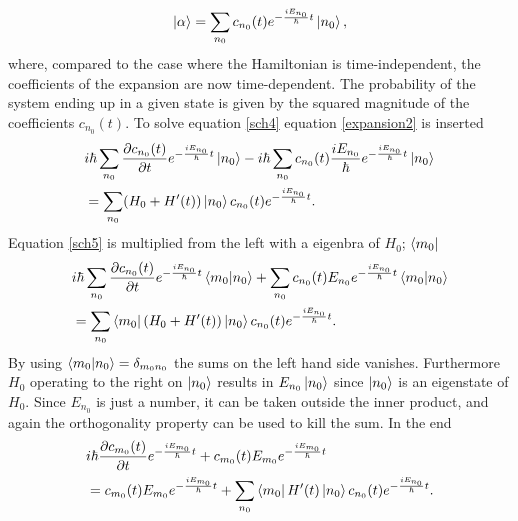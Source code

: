 \begin{equation}
	\ket{\alpha}=\sum_{n_0}^{}c_{n_0}(t)e^{-\frac{iE_{n_0}}{\hbar}t}\ket{n_0},
	\label{expansion2}
\end{equation}  
where, compared to the case where the Hamiltonian is time-independent, the coefficients of the expansion are now time-dependent. The probability of the system ending up in a given state is given by the squared magnitude of the coefficients $c_{n_0}(t)$. To solve equation \eqref{sch4} equation \eqref{expansion2} is inserted
\begin{equation}
	\begin{split}
		&i\hbar\sum_{n_0}^{}\frac{\partial c_{n_0}(t)}{\partial t}e^{-\frac{iE_{n_0}}{\hbar}t}\ket{n_0}-i\hbar\sum_{n_0}^{}c_{n_0}(t)\frac{iE_{n_0}}{\hbar}e^{-\frac{iE_{n_0}}{\hbar}t}\ket{n_0}\\
		&=\sum_{n_0}^{}(H_0+H'(t))\ket{n_0}c_{n_0}(t)e^{-\frac{iE_{n_0}}{\hbar}t}.
	\end{split}
	\label{sch5}
\end{equation} 
Equation \eqref{sch5} is multiplied from the left with a eigenbra of $H_0$; $\bra{m_{0}}$
\begin{equation}
	\begin{split}
		&	i\hbar\sum_{n_0}^{}\frac{\partial c_{n_0}(t)}{\partial t}e^{-\frac{iE_{n_0}}{\hbar}t}\braket{m_0|n_0}+\sum_{n_0}^{}c_{n_0}(t)E_{n_0}e^{-\frac{iE_{n_0}}{\hbar}t}\braket{m_0|n_0}\\
		&=\sum_{n_0}^{}\bra{m_0}(H_0+H'(t))\ket{n_0}c_{n_0}(t)e^{-\frac{iE_{n_0}}{\hbar}t}.
	\end{split}
	\label{sch6}
\end{equation} 
By using $\braket{m_0|n_0}=\delta_{m_0n_0}$ the sums on the left hand side vanishes. Furthermore $H_0$ operating to the right on $\ket{n_0}$  results in $E_{n_0}\ket{n_0}$ since $\ket{n_0}$ is an eigenstate of $H_0$. Since $E_{n_0}$ is just a number, it can be taken outside the inner product, and again the orthogonality property can be used to kill the sum. In the end
\begin{equation}
	\begin{split}
		&	i\hbar\frac{\partial c_{m_0}(t)}{\partial t}e^{-\frac{iE_{m_0}}{\hbar}t}+c_{m_0}(t)E_{m_0}e^{-\frac{iE_{m_0}}{\hbar}t}\\
		&=c_{m_0}(t)E_{m_0}e^{-\frac{iE_{m_0}}{\hbar}t}+\sum_{n_0}^{}\bra{m_0}H'(t)\ket{n_0}c_{n_0}(t)e^{-\frac{iE_{n_0}}{\hbar}t}.
	\end{split}
	\label{sch7}
\end{equation} 
